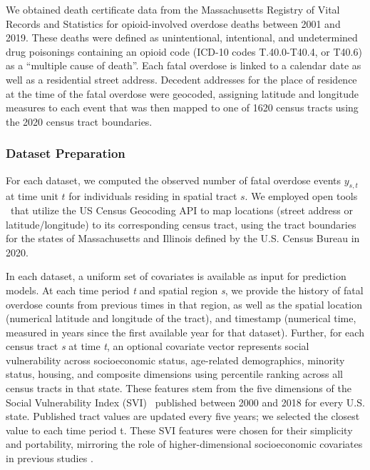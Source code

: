 We obtained death certificate data from the Massachusetts Registry of Vital Records and Statistics for opioid-involved overdose deaths between 2001 and 2019. These deaths were defined as unintentional, intentional, and undetermined drug poisonings containing an opioid code (ICD-10 codes T.40.0-T40.4, or T40.6) as a ``multiple cause of death''. Each fatal overdose is linked to a calendar date as well as a residential street address. Decedent addresses for the place of residence at the time of the fatal overdose were geocoded, assigning latitude and longitude measures to each event that was then mapped to one of 1620 census tracts using the 2020 census tract boundaries.

\subsubsection{Dataset Preparation}\label{dataset-preparation}

For each dataset, we computed the observed number of fatal overdose events \(y_{s,t}\) at time unit \(t\) for individuals residing in spatial tract \(s\). 
We employed open tools \citep{freemanCensusgeocodeThinPython}
\ that utilize the US Census Geocoding API to map locations (street address or latitude/longitude) to its corresponding census tract, using the tract boundaries for the states of Massachusetts and Illinois defined by the U.S. Census Bureau in 2020.

In each dataset, a uniform set of covariates is available as input for prediction models. At each time period \emph{t} and spatial region \emph{s}, we provide the history of fatal overdose counts from previous times in that region, as well as the spatial location (numerical latitude and longitude of the tract), and timestamp (numerical time, measured in years since the first available year for that dataset). Further, for each census tract \emph{s} at time \emph{t}, an optional covariate vector represents social vulnerability across socioeconomic status, age-related demographics, minority status, housing, and composite dimensions using percentile ranking across all census tracts in that state. 
These features stem from the five dimensions of the Social Vulnerability Index (SVI) \citep{CDCATSDRSVI2022}
\ published between 2000 and 2018 for every U.S. state. Published tract values are updated every five years; we selected the closest value to each time period t. These SVI features were chosen for their simplicity and portability, mirroring the role of higher-dimensional socioeconomic covariates in previous studies \citep{bauerSmallAreaForecasting2023,marksIdentifyingCountiesRisk2021}.

